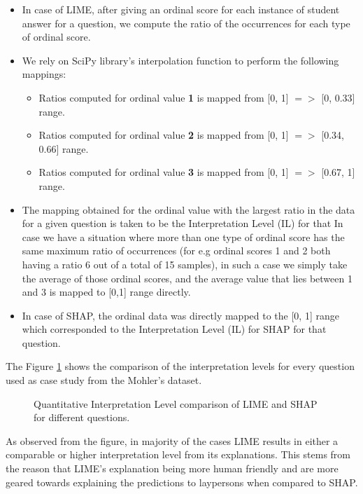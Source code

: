 \documentclass[letterpaper, 10 pt, conference]{ieeeconf}  %
\begin{document}
\begin{itemize}
\item In case of LIME, after giving an ordinal score for each instance of student answer for a question, we compute the ratio of the occurrences for each type of ordinal score.
\item We rely on  SciPy library’s interpolation function to perform the following mappings:
\begin{itemize}
\item Ratios computed for ordinal value \textbf{1} is mapped from [0, 1] $=>$ [0, 0.33] range.
\item Ratios computed for ordinal value \textbf{2} is mapped from [0, 1] $=>$ [0.34, 0.66] range.
\item Ratios computed for ordinal value \textbf{3} is mapped from [0, 1] $=>$ [0.67, 1] range. 
\end{itemize}
\item The mapping obtained for the ordinal value with the largest ratio in the data for a given question is taken to be the Interpretation Level (IL) for that In case we have a situation where more than one type of ordinal score has the same maximum ratio of occurrences (for e.g ordinal scores 1 and 2 both having a ratio 6 out of a total of 15 samples), in such a case we simply take the average of those ordinal scores, and the average value that lies between 1 and 3 is mapped to [0,1] range directly. 
\item In case of SHAP, the ordinal data was directly mapped to the [0, 1] range which corresponded to the Interpretation Level (IL) for SHAP for that question.
\end{itemize}
The Figure \ref{fig:comparison1} shows the comparison of the interpretation levels for every question used as case study from the Mohler's dataset.
\begin{figure}[H]
\caption{Quantitative Interpretation Level comparison of LIME and SHAP for different questions.}
\label{fig:comparison1}
\end{figure}
As observed from the figure, in majority of the cases LIME results in either a comparable or higher interpretation level from its explanations. This stems from the reason that LIME's explanation being more human friendly and are more geared towards explaining the predictions to laypersons when compared to SHAP.
\end{document}
